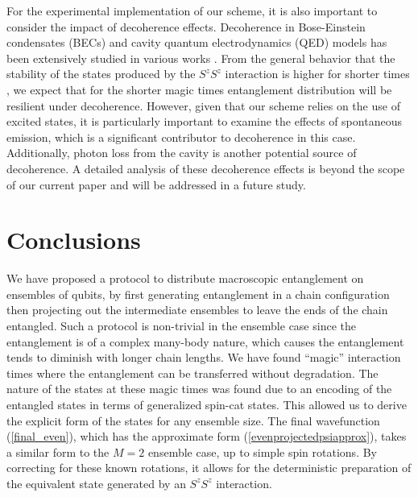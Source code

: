 \documentclass[%
  prx,%
  twocolumn,%
  preprintnumbers,%
  amsmath,%
  amssymb,%
  superscriptaddress%
]{revtex4}
\begin{document}
{For the experimental implementation of our scheme, it is also important to consider the impact of decoherence effects. Decoherence in Bose-Einstein condensates (BECs) and cavity quantum electrodynamics (QED) models has been extensively studied in various works \cite{Anglin1997,Burt1997,Dalvit2000,Ferrini2011,Li2008,Li2009,Pellizzari1995,Putz2014,Sinatra1998,Schlosshauer2019}. From the general behavior that the stability of the states produced by the $ S^z S^z $ interaction is higher for shorter times \cite{byrnes2013fractality}, we expect that for the shorter magic times entanglement distribution will be resilient under decoherence.  However, given that our scheme relies on the use of excited states, it is particularly important to examine the effects of spontaneous emission, which is a significant contributor to decoherence in this case. Additionally, photon loss from the cavity is another potential source of decoherence. A detailed analysis of these decoherence effects is beyond the scope of our current paper and will be addressed in a future study.




\section{Conclusions}

We have proposed a protocol to distribute macroscopic entanglement on ensembles of qubits, by first generating entanglement in a chain configuration then projecting out the intermediate ensembles to leave the ends of the chain entangled.  Such a protocol is non-trivial in the ensemble case since the entanglement is of a complex many-body nature, which causes the entanglement tends to diminish with longer chain lengths.  We have found ``magic'' interaction times where the entanglement can be transferred without degradation.  The nature of the states at these magic times was found due to an encoding of the entangled states in terms of generalized spin-cat states.  This allowed us to derive the explicit form of the states for any ensemble size. The final wavefunction (\ref{final_even}), which has the approximate form (\ref{evenprojectedpsiapprox}), takes a similar form to the $ M = 2 $ ensemble case, up to simple spin rotations.  By correcting for these known rotations, it allows for the deterministic preparation of the equivalent state generated by an $ S^z S^z $ interaction.

}
\end{document}
